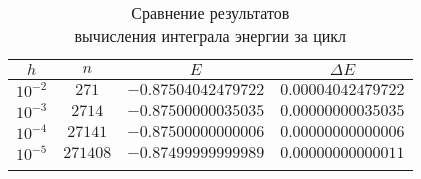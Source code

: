 \begin{frame}

\begin{table}[h]
  \centering
  \caption{Сравнение результатов \\ вычисления интеграла энергии за цикл}
  \begin{tabular}{cccc}
    \toprule
    $ h $ &
    $ n $ &
    $ E $ &
    $ \Delta E $ \\
    \midrule
    $ 10^{-2} $ & $ 271 $ & $ -0.87504042479722 $ & $ 0.00004042479722 $ \\
    \arrayrulecolor{black!40}
    \midrule
    $ 10^{-3} $ & $ 2714 $ & $ -0.87500000035035 $ & $ 0.00000000035035 $ \\
    \midrule
    $ 10^{-4} $ & $ 27141 $ & $ -0.87500000000006 $ & $ 0.00000000000006 $ \\
    \midrule
    $ 10^{-5} $ & $ 271408 $ & $ -0.87499999999989 $ & $ 0.00000000000011 $ \\
    \arrayrulecolor{black}
    \bottomrule
  \end{tabular}
\end{table}

\end{frame}


